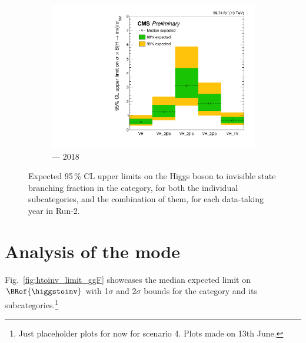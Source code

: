 \begin{figure}[htbp]
    \begin{subfigure}[b]{0.45\textwidth}
        \includegraphics[width=\textwidth]{figures/limits/VH/limit_2018_VH_Scenario5.pdf}
        \caption{\VH --- 2018}
    \end{subfigure}
    \caption[Expected 95\,\% CL upper limits on the Higgs boson to invisible state branching fraction in the \VH category, for both the individual subcategories, and the combination of them, for each data-taking year in Run-2]{Expected 95\,\% CL upper limits on the Higgs boson to invisible state branching fraction in the \VH category, for both the individual subcategories, and the combination of them, for each data-taking year in Run-2.}
    \label{fig:htoinv_limit_VH}
\end{figure}




\section{Analysis of the \texorpdfstring{\ggH}{ggH} mode}
\label{sec:htoinv_analysis_ggF}


Fig.~\ref{fig:htoinv_limit_ggF} showcases the median expected limit on $\BRof{\higgstoinv}$ with 1$\sigma$ and 2$\sigma$ bounds for the \ggH category and its subcategories.\footnote{Just placeholder plots for now for scenario 4. Plots made on 13th June.}

